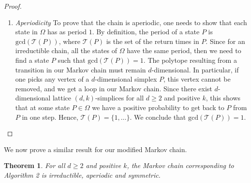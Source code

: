 \documentclass[a4paper]{article}
\newtheorem{theorem}{Theorem}
\begin{document}
\begin{proof}
\begin{enumerate}[i]
     \item \textit{Aperiodicity}
     To prove that the chain is aperiodic, one needs to show that each state in $\Omega$ has as period $1$. By definition, the period of a state $P$ is $\mathrm{gcd}(\mathcal{T}(P))$, where $\mathcal{T}(P)$ is the set of the return times in $P$. Since for an irreductible chain, all the states of $\Omega$ have the same period, then we need to find a state $P$ such that $\mathrm{gcd}(\mathcal{T}(P)) = 1$. The polytope resulting from a transition in our Markov chain must remain $d$-dimensional. In particular, if one picks any vertex of a $d$-dimensional simplex $P$, this vertex cannot be removed, and we get a loop in our Markov chain. Since there exist $d$-dimensional lattice $(d,k)$-simplices for all $d\geq2$ and positive $k$, this shows that at some state $P \in\Omega$ we have a positive probability to get back to $P$ from $P$ in one step.
     Hence, $\mathcal{T}(P) = \{1, \dots\}$. We conclude that $\mathrm{gcd}(\mathcal{T}(P)) = 1$.

   \end{enumerate}
\end{proof}

We now prove a similar result for our modified Markov chain.

\begin{theorem}\label{Thm.Move}
  For all $d\geq2$ and positive $k$, the Markov chain corresponding to Algorithm 2 is irreductible, aperiodic and symmetric.
\end{theorem}
\end{document}

